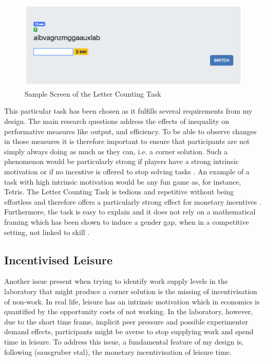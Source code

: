     \begin{figure}
        \centering
        \includegraphics[width=\textwidth]{graphs/screenshot_RET_alone.png}
        \caption{Sample Screen of the Letter Counting Task}
        \label{fig:LC_screen}
    \end{figure}
    
    This particular task has been chosen as it fulfills several requirements from my design. The main research questions address the effects of inequality on performative measures like output, and efficiency. To be able to observe changes in those measures it is therefore important to ensure that participants are not simply always doing as much as they can, i.e. a corner solution. Such a phenomenon would be particularly strong if players have a strong intrinsic motivation or if no incentive is offered to stop solving tasks \citep{frey1997}. An example of a task with high intrinsic motivation would be any fun game as, for instance, Tetris.
    The Letter Counting Task is tedious and repetitive without being effortless and therefore offers a particularly strong effect for monetary incentives \citep{cerasoli2014}.\\ 
    
    Furthermore, the task is easy to explain and it does not rely on a mathematical framing which has been shown to induce a gender gap, when in a competitive setting, not linked to skill \citep{niederle2010}.\\

    
    \subsection{Incentivised Leisure}
    
    Another issue present when trying to identify work supply levels in the laboratory that might produce a corner solution is the missing of incentivisation of non-work. In real life, leisure has an intrinsic motivation which in economics is quantified by the opportunity costs of not working. In the laboratory, however, due to the short time frame, implicit peer pressure and possible experimenter demand effects, participants might be averse to stop supplying work and spend time in leisure. To address this issue, a fundamental feature of my design is, following (sausgruber etal), the monetary incentivisation of leisure time.\\
    
